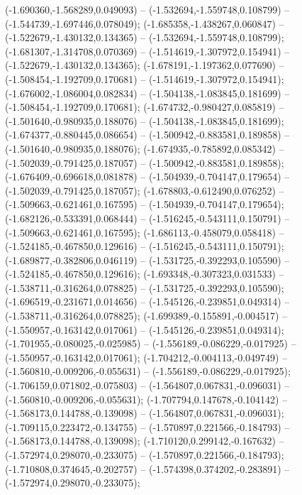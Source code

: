 (-1.690360,-1.568289,0.049093) -- (-1.532694,-1.559748,0.108799) -- (-1.544739,-1.697446,0.078049);
 (-1.685358,-1.438267,0.060847) -- (-1.522679,-1.430132,0.134365) -- (-1.532694,-1.559748,0.108799);
 (-1.681307,-1.314708,0.070369) -- (-1.514619,-1.307972,0.154941) -- (-1.522679,-1.430132,0.134365);
 (-1.678191,-1.197362,0.077690) -- (-1.508454,-1.192709,0.170681) -- (-1.514619,-1.307972,0.154941);
 (-1.676002,-1.086004,0.082834) -- (-1.504138,-1.083845,0.181699) -- (-1.508454,-1.192709,0.170681);
 (-1.674732,-0.980427,0.085819) -- (-1.501640,-0.980935,0.188076) -- (-1.504138,-1.083845,0.181699);
 (-1.674377,-0.880445,0.086654) -- (-1.500942,-0.883581,0.189858) -- (-1.501640,-0.980935,0.188076);
 (-1.674935,-0.785892,0.085342) -- (-1.502039,-0.791425,0.187057) -- (-1.500942,-0.883581,0.189858);
 (-1.676409,-0.696618,0.081878) -- (-1.504939,-0.704147,0.179654) -- (-1.502039,-0.791425,0.187057);
 (-1.678803,-0.612490,0.076252) -- (-1.509663,-0.621461,0.167595) -- (-1.504939,-0.704147,0.179654);
 (-1.682126,-0.533391,0.068444) -- (-1.516245,-0.543111,0.150791) -- (-1.509663,-0.621461,0.167595);
 (-1.686113,-0.458079,0.058418) -- (-1.524185,-0.467850,0.129616) -- (-1.516245,-0.543111,0.150791);
 (-1.689877,-0.382806,0.046119) -- (-1.531725,-0.392293,0.105590) -- (-1.524185,-0.467850,0.129616);
 (-1.693348,-0.307323,0.031533) -- (-1.538711,-0.316264,0.078825) -- (-1.531725,-0.392293,0.105590);
 (-1.696519,-0.231671,0.014656) -- (-1.545126,-0.239851,0.049314) -- (-1.538711,-0.316264,0.078825);
 (-1.699389,-0.155891,-0.004517) -- (-1.550957,-0.163142,0.017061) -- (-1.545126,-0.239851,0.049314);
 (-1.701955,-0.080025,-0.025985) -- (-1.556189,-0.086229,-0.017925) -- (-1.550957,-0.163142,0.017061);
 (-1.704212,-0.004113,-0.049749) -- (-1.560810,-0.009206,-0.055631) -- (-1.556189,-0.086229,-0.017925);
 (-1.706159,0.071802,-0.075803) -- (-1.564807,0.067831,-0.096031) -- (-1.560810,-0.009206,-0.055631);
 (-1.707794,0.147678,-0.104142) -- (-1.568173,0.144788,-0.139098) -- (-1.564807,0.067831,-0.096031);
 (-1.709115,0.223472,-0.134755) -- (-1.570897,0.221566,-0.184793) -- (-1.568173,0.144788,-0.139098);
 (-1.710120,0.299142,-0.167632) -- (-1.572974,0.298070,-0.233075) -- (-1.570897,0.221566,-0.184793);
 (-1.710808,0.374645,-0.202757) -- (-1.574398,0.374202,-0.283891) -- (-1.572974,0.298070,-0.233075);
